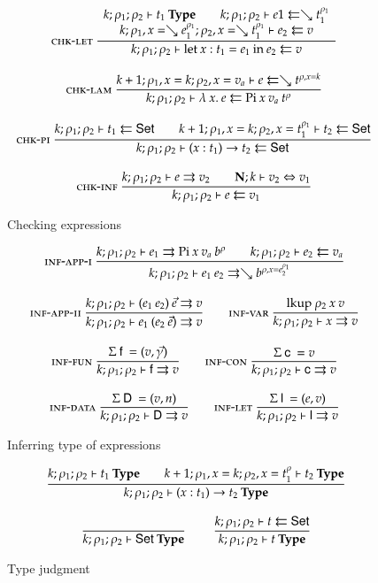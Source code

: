 \begin{figure}

\begin{gather*}
\mbox{\sc chk-let}\ \dfrac{\begin{array}[b]{c}
k;\rho_1;\rho_2\vdash t_1\:\mathbf{Type}
\qquad
k;\rho_1;\rho_2\vdash e1\leftleftarrows\searrow t_1^{\rho_1}
\\
k;\rho_1,x=\searrow e_1^{\rho_1};\rho_2,x=\searrow t_1^{\rho_1}\vdash e_2\leftleftarrows v
\end{array}}{k;\rho_1;\rho_2\vdash\mathrm{let}\: x : t_1 = e_1 \: \mathrm{in}\:{e_2}\leftleftarrows v}
\\[2ex]
\mbox{\sc chk-lam}\ \dfrac{k+1;\rho_1,x=k;\rho_2,x=v_a\vdash e\leftleftarrows\searrow t^{\rho,x=k}}{k;\rho_1;\rho_2\vdash\lambda\: x .\:{e}\leftleftarrows\mathrm{Pi} \: x \: v_a \: t^{\rho}}
\\[2ex]
\mbox{\sc chk-pi}\ \dfrac{k;\rho_1;\rho_2\vdash t_1\leftleftarrows\mathsf{Set}
\qquad
k+1;\rho_1,x=k;\rho_2,x=t_1^{\rho_1}\vdash t_2\leftleftarrows\mathsf{Set}
}{k;\rho_1;\rho_2\vdash( x : t_1 ) \rightarrow{t_2}\leftleftarrows\mathsf{Set}}
\\[2ex]
\mbox{\sc chk-inf}\ \dfrac{k;\rho_1;\rho_2\vdash e\rightrightarrows v_2
\qquad
{\mathbf{N};k\vdash v_2\Leftrightarrow v_1}}{k;\rho_1;\rho_2\vdash e\leftleftarrows v_1}
\end{gather*}
\caption{Checking expressions}
\end{figure}

\begin{figure}
\begin{gather*}
\mbox{\sc inf-app-i}\ \dfrac{k;\rho_1;\rho_2\vdash e_1\rightrightarrows\mathrm{Pi} \: x \: v_a \: b^{\rho}
\qquad k;\rho_1;\rho_2\vdash e_2\leftleftarrows v_a}{k;\rho_1;\rho_2\vdash e_1 \: e_2\rightrightarrows\searrow b^{\rho,x=e_2^{\rho_1}}}
\\[2ex]
\mbox{\sc inf-app-ii}\ \dfrac{k;\rho_1;\rho_2\vdash(e_1 \: e_2)\:\vec{e}\rightrightarrows v}{k;\rho_1;\rho_2\vdash e_1 \: (e_2 \: \vec{e})\rightrightarrows v}
\qquad
\mbox{\sc inf-var}\ \dfrac{\mathrm{lkup} \: \rho_2 \: x \: v}{k;\rho_1;\rho_2\vdash x\rightrightarrows v}
\\[2ex]
\mbox{\sc inf-fun}\ \dfrac{\mathrm{\Sigma} \: \mathsf{f} \: = (v,\vec{\gamma}) }{k;\rho_1;\rho_2\vdash\mathsf{f}\rightrightarrows v}
\qquad
\mbox{\sc inf-con}\ \dfrac{\mathrm{\Sigma} \: \mathsf{c} \: = v}{k;\rho_1;\rho_2\vdash\mathsf{c}\rightrightarrows v}
\\[2ex] 
\mbox{\sc inf-data}\ \dfrac{\mathrm{\Sigma} \: \mathsf{D} \: = (v,n)}{k;\rho_1;\rho_2\vdash\mathsf{D}\rightrightarrows v} 
\qquad
\mbox{\sc inf-let}\ \dfrac{\mathrm{\Sigma} \: \mathsf{l} \: = (e,v)}{k;\rho_1;\rho_2\vdash\mathsf{l}\rightrightarrows v}
\end{gather*}
\caption{Inferring type of expressions}
\end{figure}

\begin{figure}
\begin{gather*}
\ \dfrac{k;\rho_1;\rho_2\vdash t_1\:\mathbf{Type}
\qquad
k+1;\rho_1,x=k;\rho_2,x=t_1^{\rho}\vdash t_2\:\mathbf{Type}}{k;\rho_1;\rho_2\vdash( x : t_1 ) \rightarrow{t_2}\:\mathbf{Type}}
\\[2ex]
\ \dfrac{}{k;\rho_1;\rho_2\vdash\mathsf{Set}\:\mathbf{Type}}
\qquad
\ \dfrac{k;\rho_1;\rho_2\vdash t\leftleftarrows\mathsf{Set}}{k;\rho_1;\rho_2\vdash t\:\mathbf{Type}}
\end{gather*}
\caption{Type judgment}
\end{figure}

